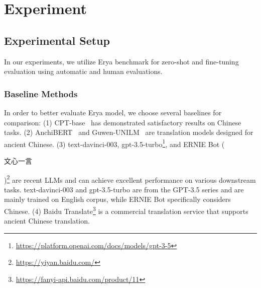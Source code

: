 \section{Experiment}
\subsection{Experimental Setup}
In our experiments, we utilize Erya benchmark for zero-shot and fine-tuning evaluation using automatic and human evaluations. 



\subsubsection{Baseline Methods}
In order to better evaluate Erya model, we choose several baselines for comparison: 
(1) CPT-base~\cite{DBLP:conf/naacl/DevlinCLT19} has demonstrated satisfactory results on Chinese tasks. 
(2) AnchiBERT~\cite{DBLP:journals/corr/abs-2009-11473} and Guwen-UNILM~\cite{DBLP:conf/nlpcc/YangCC21} are translation models designed for ancient Chinese.
(3) text-davinci-003, gpt-3.5-turbo\footnote{\url{https://platform.openai.com/docs/models/gpt-3-5}}, and ERNIE Bot (\begin{CJK*}{UTF8}{gbsn}文心一言\end{CJK*})\footnote{ \url{https://yiyan.baidu.com/}} are recent LLMs and can achieve excellent performance on various downstream tasks. text-davinci-003 and gpt-3.5-turbo are from the GPT-3.5 series and are mainly trained on English corpus, while ERNIE Bot specifically considers Chinese.
(4) Baidu Translate\footnote{\url{https://fanyi-api.baidu.com/product/11}} is a commercial translation service that supports ancient Chinese translation.





